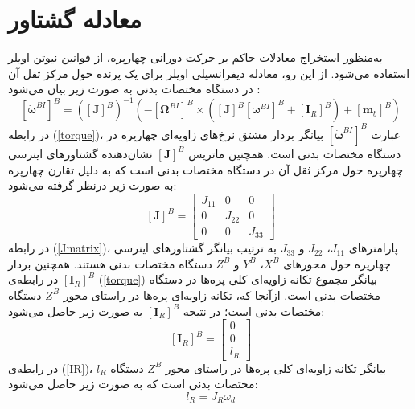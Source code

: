 \section{معادله گشتاور}\label{sec:moment}
به‌منظور استخراج معادلات حاکم بر حرکت دورانی چهارپره، از قوانین نیوتن-اویلر استفاده می‌شود. از این رو،
معادله دیفرانسیلی اویلر برای یک پرنده حول مرکز ثقل آن در دستگاه مختصات بدنی به صورت زیر بیان می‌شود \cite{zipfel2000modeling}:
\begin{equation}\label{torque}
	\left[\dot{\boldsymbol{\omega}}^{BI}\right]^B = \left(\left[\boldsymbol J\right]^B\right)^{-1}
	\left(-\left[\boldsymbol \Omega^{BI}\right]^B\times\left(
	\left[\boldsymbol J\right]^B\left[\boldsymbol \omega^{BI}\right]^B+
	\left[\boldsymbol I_R\right]^B
	\right)+ \left[\boldsymbol m_b\right]^B\right)
\end{equation}
در رابطه
(\ref{torque})، عبارت 
$\left[\dot{\boldsymbol\omega}^{BI}\right]^B$
بیانگر بردار مشتق نرخ‌های زاویه‌ای چهارپره در دستگاه مختصات بدنی است. همچنین ماتریس 
$\left[\boldsymbol J\right]^B$
نشان‌دهنده گشتاورهای اینرسی چهارپره حول مرکز ثقل آن در دستگاه مختصات بدنی است که به دلیل تقارن چهارپره به صورت زیر درنظر گرفته
 می‌شود:
 \begin{equation}\label{Jmatrix}
 	\left[\boldsymbol J\right]^B = \begin{bmatrix}
 		J_{11} & 0 &0\\
 		0 & J_{22} & 0\\
 		0 & 0 & J_{33}
 	\end{bmatrix}
 \end{equation}
در رابطه 
(\ref{Jmatrix})، پارامترهای 
$J_{11}$،
$J_{22}$
و 
$J_{33}$
به ترتیب بیانگر گشتاور‌های اینرسی چهارپره حول محورهای 
$X^B$،
$Y^B$
و 
$Z^B$
دستگاه مختصات بدنی هستند. همچنین بردار 
$\left[\boldsymbol I_R\right]^B$
در رابطه‌ی 
(\ref{torque})
بیانگر مجموع تكانه زاویه‌ای کلی پره‌ها در دستگاه مختصات بدنی است. ازآنجا که، تكانه زاویه‌ای پره‌ها در راستای محور
$Z^B$
دستگاه مختصات بدنی است؛ در نتیجه 
$\left[\boldsymbol I_R\right]^B$
به صورت زیر حاصل می‌شود:
\begin{equation}\label{IR}
	\left[\boldsymbol I_R\right]^B = 
	\begin{bmatrix}
		0\\0\\l_R
	\end{bmatrix}
\end{equation}
در رابطه‌ی 
(\ref{IR})، 
$l_R$
بیانگر تكانه زاویه‌ای کلی پره‌ها در راستای محور
$Z^B$
دستگاه مختصات بدنی است که به صورت زیر حاصل می‌شود:
\begin{equation}\label{IRomega}
	l_R = J_R\omega_d
\end{equation}
